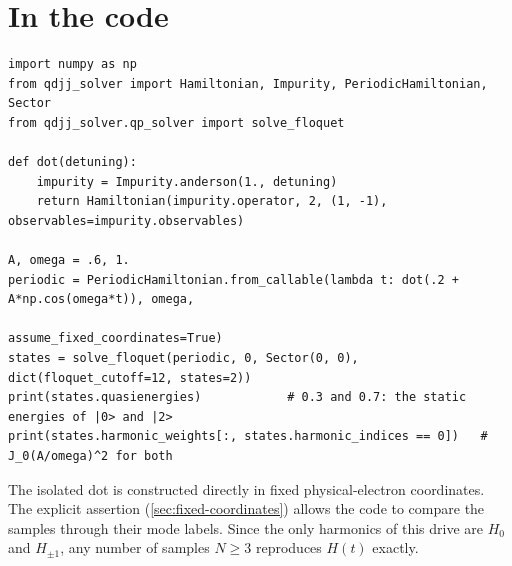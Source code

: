 \section{In the code}

\begin{lstlisting}
import numpy as np
from qdjj_solver import Hamiltonian, Impurity, PeriodicHamiltonian, Sector
from qdjj_solver.qp_solver import solve_floquet

def dot(detuning):
    impurity = Impurity.anderson(1., detuning)
    return Hamiltonian(impurity.operator, 2, (1, -1), observables=impurity.observables)

A, omega = .6, 1.
periodic = PeriodicHamiltonian.from_callable(lambda t: dot(.2 + A*np.cos(omega*t)), omega,
                                             assume_fixed_coordinates=True)
states = solve_floquet(periodic, 0, Sector(0, 0), dict(floquet_cutoff=12, states=2))
print(states.quasienergies)            # 0.3 and 0.7: the static energies of |0> and |2>
print(states.harmonic_weights[:, states.harmonic_indices == 0])   # J_0(A/omega)^2 for both
\end{lstlisting}

The isolated dot is constructed directly in fixed physical-electron coordinates.
The explicit assertion  (\cref{sec:fixed-coordinates})
allows the code to compare the samples through their mode labels. Since the only harmonics of this drive
are $H_0$ and $H_{\pm1}$, any number of samples $N\ge3$ reproduces $H(t)$ exactly.

